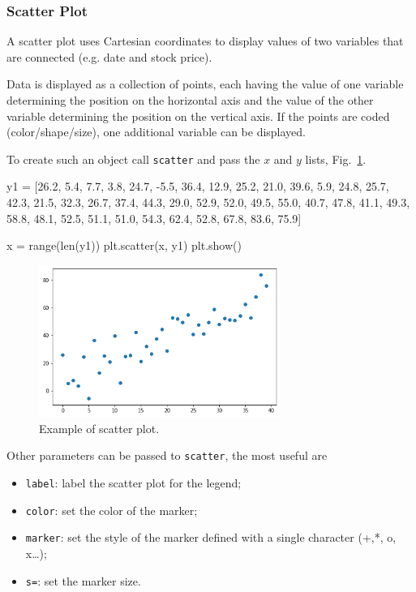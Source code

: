 \subsubsection{Scatter Plot}
\label{scatter}

A scatter plot uses Cartesian coordinates to display values of two variables that are connected (e.g. date and stock price). 

Data is displayed as a collection of points, each having the value of one variable determining the position on the horizontal axis and the value of the other variable determining the position on the vertical axis. If the points are coded (color/shape/size), one additional variable can be displayed.

To create such an object call \texttt{scatter} and pass the $x$ and $y$ lists, Fig.~\ref{fig:scatter1}.

\begin{ipython}
y1 = [26.2, 5.4, 7.7, 3.8, 24.7, -5.5, 36.4, 12.9, 25.2, 21.0, 39.6,
      5.9, 24.8, 25.7, 42.3, 21.5, 32.3, 26.7, 37.4, 44.3, 29.0,
      52.9, 52.0, 49.5, 55.0, 40.7, 47.8, 41.1, 49.3, 58.8, 48.1,
      52.5, 51.1, 51.0, 54.3, 62.4, 52.8, 67.8, 83.6, 75.9]

x = range(len(y1))
plt.scatter(x, y1)
plt.show()
\end{ipython}

\begin{figure}[htb]
	\centering
	\includegraphics[width=0.7\textwidth]{figures/scatter}
	\caption{Example of scatter plot.}
	\label{fig:scatter1}
\end{figure}

Other parameters can be passed to \texttt{scatter}, the most useful are

\begin{itemize}
\tightlist
\item \texttt{label}: label the scatter plot for the legend;
\item \texttt{color}: set the color of the marker;
\item \texttt{marker}: set the style of the marker defined with a single character (+,*, o, x\ldots{});
\item \texttt{s=}: set the marker size.
\end{itemize}

